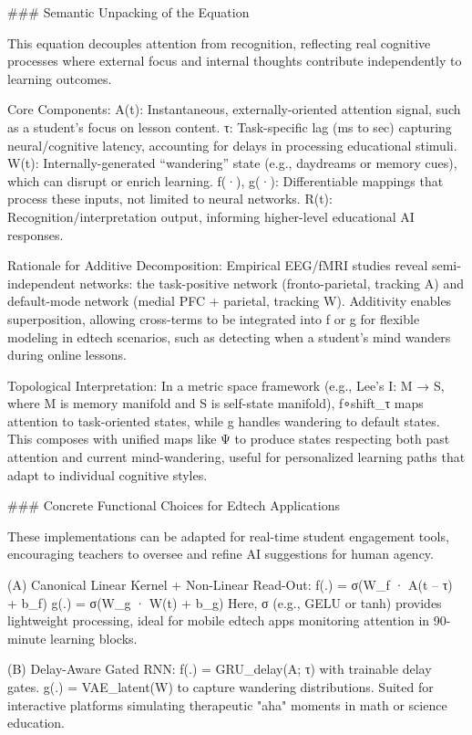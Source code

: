 ### Semantic Unpacking of the Equation

This equation decouples attention from recognition, reflecting real cognitive processes where external focus and internal thoughts contribute independently to learning outcomes.

Core Components:
A(t): Instantaneous, externally-oriented attention signal, such as a student's focus on lesson content.
τ: Task-specific lag (ms to sec) capturing neural/cognitive latency, accounting for delays in processing educational stimuli.
W(t): Internally-generated “wandering” state (e.g., daydreams or memory cues), which can disrupt or enrich learning.
f(·), g(·): Differentiable mappings that process these inputs, not limited to neural networks.
R(t): Recognition/interpretation output, informing higher-level educational AI responses.

Rationale for Additive Decomposition:
Empirical EEG/fMRI studies reveal semi-independent networks: the task-positive network (fronto-parietal, tracking A) and default-mode network (medial PFC + parietal, tracking W).
Additivity enables superposition, allowing cross-terms to be integrated into f or g for flexible modeling in edtech scenarios, such as detecting when a student's mind wanders during online lessons.

Topological Interpretation:
In a metric space framework (e.g., Lee's I: M → S, where M is memory manifold and S is self-state manifold), f∘shift_τ maps attention to task-oriented states, while g handles wandering to default states.
This composes with unified maps like Ψ to produce states respecting both past attention and current mind-wandering, useful for personalized learning paths that adapt to individual cognitive styles.

### Concrete Functional Choices for Edtech Applications

These implementations can be adapted for real-time student engagement tools, encouraging teachers to oversee and refine AI suggestions for human agency.

(A) Canonical Linear Kernel + Non-Linear Read-Out:
f(.) = σ(W_f · A(t – τ) + b_f)
g(.) = σ(W_g · W(t) + b_g)
Here, σ (e.g., GELU or tanh) provides lightweight processing, ideal for mobile edtech apps monitoring attention in 90-minute learning blocks.

(B) Delay-Aware Gated RNN:
f(.) = GRU_delay(A; τ) with trainable delay gates.
g(.) = VAE_latent(W) to capture wandering distributions.
Suited for interactive platforms simulating therapeutic "aha" moments in math or science education.

